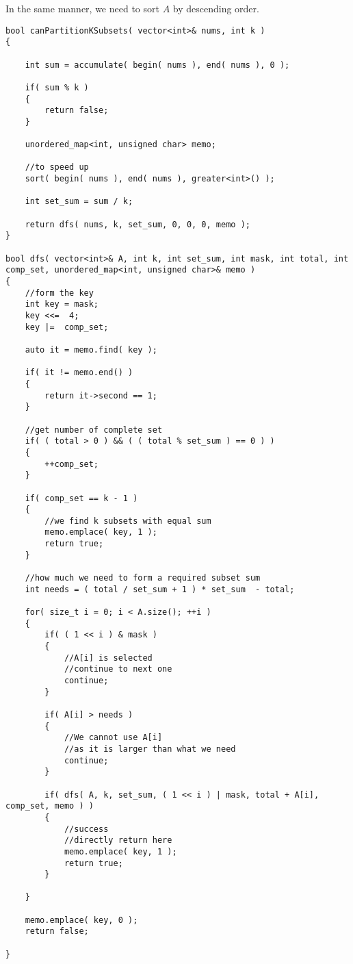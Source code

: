 In the same manner, we need to sort $A$ by descending order.

\begin{lstlisting}[style=customc, caption={DP With Memorization}]
bool canPartitionKSubsets( vector<int>& nums, int k )
{

    int sum = accumulate( begin( nums ), end( nums ), 0 );

    if( sum % k )
    {
        return false;
    }

    unordered_map<int, unsigned char> memo;

    //to speed up
    sort( begin( nums ), end( nums ), greater<int>() );

    int set_sum = sum / k;

    return dfs( nums, k, set_sum, 0, 0, 0, memo );
}

bool dfs( vector<int>& A, int k, int set_sum, int mask, int total, int comp_set, unordered_map<int, unsigned char>& memo )
{
    //form the key
    int key = mask;
    key <<=  4;
    key |=  comp_set;

    auto it = memo.find( key );

    if( it != memo.end() )
    {
        return it->second == 1;
    }

    //get number of complete set
    if( ( total > 0 ) && ( ( total % set_sum ) == 0 ) )
    {
        ++comp_set;
    }

    if( comp_set == k - 1 )
    {
        //we find k subsets with equal sum
        memo.emplace( key, 1 );
        return true;
    }

    //how much we need to form a required subset sum
    int needs = ( total / set_sum + 1 ) * set_sum  - total;

    for( size_t i = 0; i < A.size(); ++i )
    {
        if( ( 1 << i ) & mask )
        {
            //A[i] is selected
            //continue to next one
            continue;
        }

        if( A[i] > needs )
        {
            //We cannot use A[i]
            //as it is larger than what we need
            continue;
        }

        if( dfs( A, k, set_sum, ( 1 << i ) | mask, total + A[i], comp_set, memo ) )
        {
            //success
            //directly return here
            memo.emplace( key, 1 );
            return true;
        }

    }

    memo.emplace( key, 0 );
    return false;

}
\end{lstlisting}